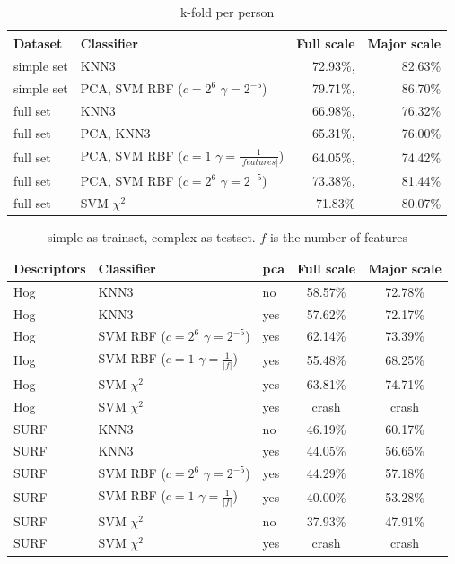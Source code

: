 \begin{table}
\centering
\begin{tabular}{llrr}
\hline\hline
Dataset & Classifier 				&  	Full scale	& Major scale	\\
\hline
simple set	& KNN3	& 72.93\%, & 82.63\%	\\
simple set	& PCA, SVM RBF ($c=2^6$ $\gamma=2^{-5}$) & 79.71\%, & 86.70\%	\\
full set	& KNN3 & 66.98\%, & 76.32\%	\\
full set	& PCA, KNN3 & 65.31\%, & 76.00\%	\\
full set	& PCA, SVM RBF ($c=1$ $\gamma=\frac{1}{|features|}$) & 64.05\%, & 74.42\%	\\
full set	& PCA, SVM RBF ($c=2^6$ $\gamma=2^{-5}$)& 73.38\%, & 81.44\%	\\
full set    & SVM $\chi^2$ &  71.83\% &80.07\% \\
\hline
\end{tabular}
\caption{k-fold per person}
\end{table}


\begin{table}
\centering
\begin{tabular}{lllcc}
\hline\hline
Descriptors & Classifier 		& pca		&  	Full scale	&	Major scale	\\
\hline
Hog & KNN3				& no	&	58.57\% 	&	72.78\%	\\
Hog & KNN3 				& yes	&	57.62\% 	&	72.17\%	\\
Hog & SVM RBF ($c=2^6$ $\gamma=2^{-5}$)			& yes & 62.14\%	&	73.39\%	\\
Hog & SVM RBF ($c=1$ $\gamma=\frac{1}{|f|}$)	& yes & 55.48\%	&	68.25\%	\\
Hog & SVM $\chi^2$ 		&	yes	&	63.81\%	&	74.71\%	\\
Hog & SVM $\chi^2$		&	yes &	crash 	&	crash \\
\hline
SURF & KNN3				&	no	&	46.19\% 	&	60.17\%	\\
SURF & KNN3										& yes &	44.05\% & 56.65\% \\
SURF & SVM RBF ($c=2^6$ $\gamma=2^{-5}$)		& yes &	44.29\%	&	57.18\%	\\
SURF & SVM RBF ($c=1$ $\gamma=\frac{1}{|f|}$)	& yes &	40.00\%	&	53.28\%	\\
SURF & SVM $\chi^2$								& no  &	37.93\%		&	47.91\%	\\
SURF & SVM $\chi^2$		&	yes	&	crash 	&	crash \\
\hline
\end{tabular}
\caption{simple as trainset, complex as testset. $f$ is the number of features}
\end{table}


